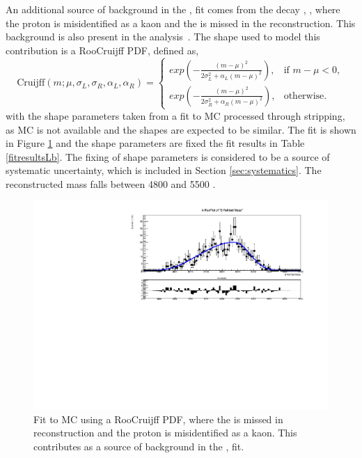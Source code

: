 An additional source of background in the \decay{\Bm}{\D\Kstarm}, \decay{\D}{\Kp\Km} fit comes from the decay \decay{\Lb}{\Lc\Kstar}, , where the proton is misidentified as a kaon and the \pion is missed in the reconstruction. This background is also present in the \decay{\Bm}{\D\Km} analysis~\cite{LHCb-PAPER-2016-003}. The shape used to model this contribution is a RooCruijff PDF, defined as,
\begin{equation}
  \mathrm{Cruijff}(m; \mu,\sigma_L,\sigma_R,\alpha_L,\alpha_R)=
\begin{cases}
    exp \left( -\frac{(m-\mu)^2}{2\sigma_L^2 + \alpha_L(m-\mu)^2} \right) ,     & \text{if } m-\mu < 0, \\
    exp \left( -\frac{(m-\mu)^2}{2\sigma_R^2 + \alpha_R(m-\mu)^2} \right) ,     & \text{otherwise.}
\end{cases}
\label{Cruijff}
\end{equation}%
with the shape parameters taken from a fit to \decay{\Lb}{\Lc\kaon} MC processed through \decay{\Bm}{\D\Km} stripping, as \decay{\Lb}{\Lc\kaon} MC is not available and the shapes are expected to be similar. The fit is shown in Figure \ref{Lbfit} and the shape parameters are fixed the fit results in Table \ref{fitresultsLb}. The fixing of shape parameters is considered to be a source of systematic uncertainty, which is included in Section \ref{sec:systematics}. The reconstructed \B mass falls between 4800 and 5500 \mev.

\begin{figure}[h]
\centering
\includegraphics[width=0.7\linewidth]{figures/backgrounds/Lb2LcKst.pdf}
\caption{Fit to  MC using a RooCruijff PDF, where the \pion is missed in reconstruction and the proton is misidentified as a kaon. This contributes as a source of background in the \decay{\Bm}{\D\Kstarm}, \decay{\D}{\Kp\Km} fit.}
\label{Lbfit}
\end{figure}

